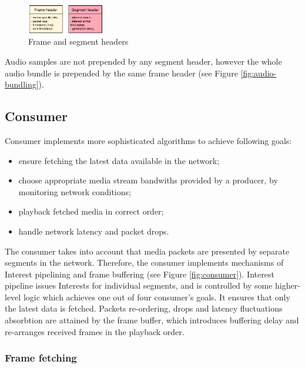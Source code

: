 \documentclass{icn/sig-alternate-2012} %
\begin{document}
\begin{figure}[t!]
\centering
\includegraphics[width=0.3\textwidth]{data-struct}
\vspace{-4pt}
\caption{Frame and segment headers}
\label{fig:data-struct}
\end{figure}

Audio samples are not prepended by any segment header, however the whole audio bundle is prepended by the same frame header (see Figure \ref{fig:audio-bundling}).

\subsection{Consumer}

Consumer implements more sophisticated algorithms to achieve following goals:
\begin{itemize}
\item ensure fetching the latest data available in the network; 
\item choose appropriate media stream bandwiths provided by a producer, by monitoring network conditions;
\item playback fetched media in correct order;
\item handle network latency and packet drops.
\end{itemize}

The consumer takes into account that media packets are presented by separate segments in the network. Therefore, the consumer implements mechanisms of Interest pipelining and frame buffering (see Figure \ref{fig:consumer}). Interest pipeline issues Interests for individual segments, and is controlled by some higher-level logic which achieves one out of four consumer's goals. It ensures that only the latest data is fetched. Packets re-ordering, drops and latency fluctuations absorbtion are attained by the frame buffer, which introduces buffering delay and re-arranges received frames in the playback order.



\subsubsection{Frame fetching}
\end{document}

